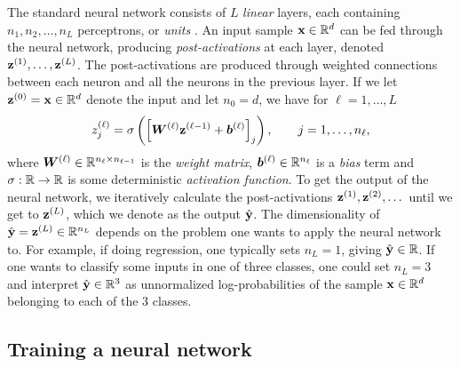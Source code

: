 \documentclass{statsmsc}
\begin{document}
{The standard neural network consists of $L$ \textit{linear} layers, each containing
$n_1,n_2,\dots,n_L$ perceptrons, or \textit{units} \citep{dnn}. An input sample $\mathbf{x} \in \mathbb{R}^d$ can be fed
through the neural network, producing \textit{post-activations} at each layer, denoted
$\mathbf{z}^{(1)}, \dots, \mathbf{z}^{(L)}$. The post-activations are produced through weighted
connections between each neuron and all the neurons in the previous layer. If we let
$\mathbf{z}^{(0)}=\mathbf{x} \in \mathbb{R}^d$ denote the input and let $n_0=d$, we have for $\ell=1,\dots,L$
\begin{equation}\label{eq:nn_update}
    z_j^{(\ell)} = \sigma \left(\left[ \boldsymbol{W}^{(\ell)} \mathbf{z}^{(\ell-1)} + \boldsymbol{b}^{(\ell)} \right]_j \right),\qquad j=1,\dots,n_\ell,
\end{equation}
where $\boldsymbol{W}^{(\ell)} \in \mathbb{R}^{n_{\ell} \times n_{\ell-1}}$ is the \textit{weight matrix},
$\boldsymbol{b}^{(\ell)} \in \mathbb{R}^{n_{\ell}}$ is a \textit{bias} term and
$\sigma : \mathbb{R} \rightarrow {\mathbb{R}}$ is some deterministic \textit{activation function}.
To get the output of the neural network, we iteratively calculate the post-activations
$\mathbf{z}^{(1)},\mathbf{z}^{(2)},\dots$ until we get to $\mathbf{z}^{(L)}$, which we denote as the output
$\hat{\mathbf{y}}$. The dimensionality of $\hat{\mathbf{y}}=\mathbf{z}^{(L)} \in \mathbb{R}^{n_L}$
depends on the problem one wants
to apply the neural network to. For example, if doing regression, one typically sets
$n_L=1$, giving $\hat{\mathbf{y}} \in \mathbb{R}$. If one wants to classify some inputs in one of three classes,
one could set $n_L=3$ and interpret $\hat{\mathbf{y}} \in \mathbb{R}^3$ as unnormalized log-probabilities of
the sample $\mathbf{x} \in \mathbb{R}^d$ belonging to each of the 3 classes.

\subsection{Training a neural network}%
\label{sub:Training a neural network}

}
\end{document}
